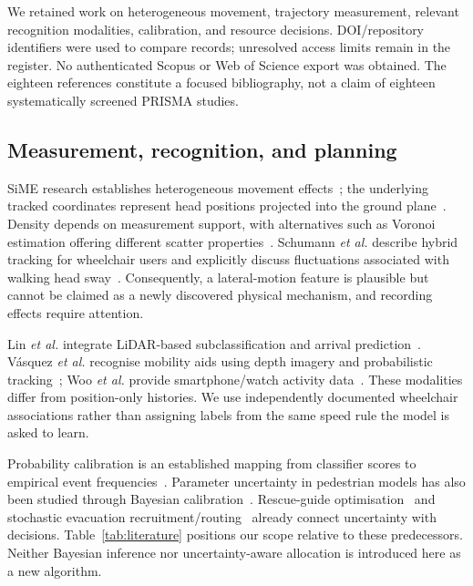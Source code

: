 \documentclass[conference]{IEEEtran}
\begin{document}
We retained work on heterogeneous movement, trajectory measurement, relevant recognition modalities, calibration, and resource decisions. DOI/repository identifiers were used to compare records; unresolved access limits remain in the register. No authenticated Scopus or Web of Science export was obtained. The eighteen references constitute a focused bibliography, not a claim of eighteen systematically screened PRISMA studies.

\subsection{Measurement, recognition, and planning}
SiME research establishes heterogeneous movement effects~\cite{sime,geoerg}; the underlying tracked coordinates represent head positions projected into the ground plane~\cite{boltes}. Density depends on measurement support, with alternatives such as Voronoi estimation offering different scatter properties~\cite{steffen}. Schumann \emph{et al.} describe hybrid tracking for wheelchair users and explicitly discuss fluctuations associated with walking head sway~\cite{tracking}. Consequently, a lateral-motion feature is plausible but cannot be claimed as a newly discovered physical mechanism, and recording effects require attention.

Lin \emph{et al.} integrate LiDAR-based subclassification and arrival prediction~\cite{lin}. V\'{a}squez \emph{et al.} recognise mobility aids using depth imagery and probabilistic tracking~\cite{vasquez}; Woo \emph{et al.} provide smartphone/watch activity data~\cite{woo}. These modalities differ from position-only histories. We use independently documented wheelchair associations rather than assigning labels from the same speed rule the model is asked to learn.

Probability calibration is an established mapping from classifier scores to empirical event frequencies~\cite{calibration}. Parameter uncertainty in pedestrian models has also been studied through Bayesian calibration~\cite{godel}. Rescue-guide optimisation~\cite{guides} and stochastic evacuation recruitment/routing~\cite{moug} already connect uncertainty with decisions. Table~\ref{tab:literature} positions our scope relative to these predecessors. Neither Bayesian inference nor uncertainty-aware allocation is introduced here as a new algorithm.
\end{document}
